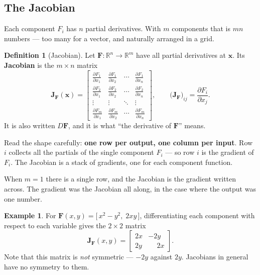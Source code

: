 \documentclass[11pt]{article}
\theoremstyle{plain}
\theoremstyle{definition}
\newtheorem{defn}{Definition}[section]
\newtheorem{ex}{Example}[section]
\theoremstyle{remark}
\newcommand{\R}{\mathbb{R}}
\newcommand{\vc}[1]{\mathbf{#1}}
\newcommand{\pd}[2]{\frac{\partial #1}{\partial #2}}
\newcommand{\mt}[1]{\mathbf{#1}}          %
\begin{document}
\subsection{The Jacobian}
Each component $F_i$ has $n$ partial derivatives. With $m$ components that is
$mn$ numbers --- too many for a vector, and naturally arranged in a grid.

\begin{defn}[Jacobian]
Let $\mt{F}:\R^{n}\to\R^{m}$ have all partial derivatives at $\vc{x}$. Its
\textbf{Jacobian} is the $m\times n$ matrix
\[
  \mt{J}_{\mt{F}}(\vc{x})
  =
  \begin{bmatrix}
    \pd{F_1}{x_1} & \pd{F_1}{x_2} & \cdots & \pd{F_1}{x_n}\\[6pt]
    \pd{F_2}{x_1} & \pd{F_2}{x_2} & \cdots & \pd{F_2}{x_n}\\[4pt]
    \vdots        & \vdots        & \ddots & \vdots\\[2pt]
    \pd{F_m}{x_1} & \pd{F_m}{x_2} & \cdots & \pd{F_m}{x_n}
  \end{bmatrix},
  \qquad
  \bigl(\mt{J}_{\mt{F}}\bigr)_{ij} = \pd{F_i}{x_j} .
\]
It is also written $D\mt{F}$, and it is what ``the derivative of $\mt{F}$''
means.
\end{defn}

\noindent Read the shape carefully: \textbf{one row per output, one column per
input}. Row $i$ collects all the partials of the single component $F_i$ --- so
row $i$ is the gradient of $F_i$. The Jacobian is a stack of gradients, one for
each component function.

When $m=1$ there is a single row, and the Jacobian is the gradient written
across. The gradient was the Jacobian all along, in the case where the output
was one number.

\begin{ex}
For $\mt{F}(x,y)=\bigl[\,x^{2}-y^{2},\;2xy\,\bigr]$, differentiating each
component with respect to each variable gives the $2\times2$ matrix
\[
  \mt{J}_{\mt{F}}(x,y)=
  \begin{bmatrix}
    2x & -2y\\
    2y & \phantom{-}2x
  \end{bmatrix} .
\]
Note that this matrix is \emph{not} symmetric --- $-2y$ against $2y$. Jacobians
in general have no symmetry to them.
\end{ex}
\end{document}

